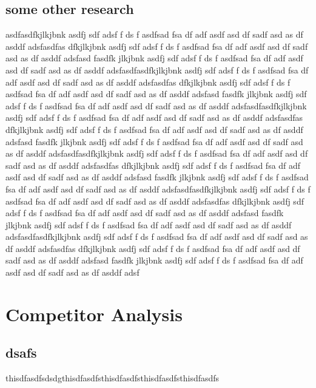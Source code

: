 \documentclass[11pt]{article}
\begin{document}
\subsection{ some other research }
asdfasdfkjlkjbnk asdfj sdf adsf f ds f asdfsad fsa df adf asdf asd df sadf asd as df asddf adsfasdfas dfkjlkjbnk asdfj sdf adsf f ds f asdfsad fsa df adf asdf asd df sadf asd as df asddf adsfasd  fasdfk  jlkjbnk asdfj sdf adsf f ds f asdfsad fsa df adf asdf asd df sadf asd as df asddf adsfasdfasdfkjlkjbnk asdfj sdf adsf f ds f asdfsad fsa df adf asdf asd df sadf asd as df asddf adsfasdfas dfkjlkjbnk asdfj sdf adsf f ds f asdfsad fsa df adf asdf asd df sadf asd as df asddf adsfasd  fasdfk  jlkjbnk asdfj sdf adsf f ds f asdfsad fsa df adf asdf asd df sadf asd as df asddf adsfasdfasdfkjlkjbnk asdfj sdf adsf f ds f asdfsad fsa df adf asdf asd df sadf asd as df asddf adsfasdfas dfkjlkjbnk asdfj sdf adsf f ds f asdfsad fsa df adf asdf asd df sadf asd as df asddf adsfasd  fasdfk  jlkjbnk asdfj sdf adsf f ds f asdfsad fsa df adf asdf asd df sadf asd as df asddf adsfasdfasdfkjlkjbnk asdfj sdf adsf f ds f asdfsad fsa df adf asdf asd df sadf asd as df asddf adsfasdfas dfkjlkjbnk asdfj sdf adsf f ds f asdfsad fsa df adf asdf asd df sadf asd as df asddf adsfasd  fasdfk  jlkjbnk asdfj sdf adsf f ds f asdfsad fsa df adf asdf asd df sadf asd as df asddf adsfasdfasdfkjlkjbnk asdfj sdf adsf f ds f asdfsad fsa df adf asdf asd df sadf asd as df asddf adsfasdfas dfkjlkjbnk asdfj sdf adsf f ds f asdfsad fsa df adf asdf asd df sadf asd as df asddf adsfasd  fasdfk  jlkjbnk asdfj sdf adsf f ds f asdfsad fsa df adf asdf asd df sadf asd as df asddf adsfasdfasdfkjlkjbnk asdfj sdf adsf f ds f asdfsad fsa df adf asdf asd df sadf asd as df asddf adsfasdfas dfkjlkjbnk asdfj sdf adsf f ds f asdfsad fsa df adf asdf asd df sadf asd as df asddf adsfasd  fasdfk  jlkjbnk asdfj sdf adsf f ds f asdfsad fsa df adf asdf asd df sadf asd as df asddf adsf


\newpage{}
\section{Competitor Analysis}
\subsection{ dsafs }
thisdfasdfsdsdgthisdfasdfsthisdfasdfsthisdfasdfsthisdfasdfs			
\end{document}
